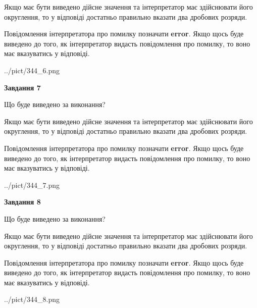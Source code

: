 \documentclass[12pt, ukrainian]{article}
\begin{document}
{\begin {Large}
Якщо має бути виведено дійсне значення та інтерпретатор має здійснювати його округлення, 
то у відповіді достатньо правильно вказати два дробових розряди.

Повідомлення інтерпретатора про помилку позначати \textbf{error}.
Якщо щось буде виведено до того, як інтерпретатор видасть повідомлення про помилку, 
то воно має вказуватись у відповіді. \par

\begin{center}
	{../pict/344_6.png}
\end{center}
\newpage

{\begin {center}\textbf{Завдання 7}\end {center}}\par
Що буде виведено за виконання? \par

Якщо має бути виведено дійсне значення та інтерпретатор має здійснювати його округлення, 
то у відповіді достатньо правильно вказати два дробових розряди.

Повідомлення інтерпретатора про помилку позначати \textbf{error}.
Якщо щось буде виведено до того, як інтерпретатор видасть повідомлення про помилку, 
то воно має вказуватись у відповіді. \par

\begin{center}
	{../pict/344_7.png}
\end{center}
\newpage

{\begin {center}\textbf{Завдання 8}\end {center}}\par
Що буде виведено за виконання? \par

Якщо має бути виведено дійсне значення та інтерпретатор має здійснювати його округлення, 
то у відповіді достатньо правильно вказати два дробових розряди.

Повідомлення інтерпретатора про помилку позначати \textbf{error}.
Якщо щось буде виведено до того, як інтерпретатор видасть повідомлення про помилку, 
то воно має вказуватись у відповіді. \par

\begin{center}
	{../pict/344_8.png}
\end{center}
\newpage


\end{Large}}
\end{document}
